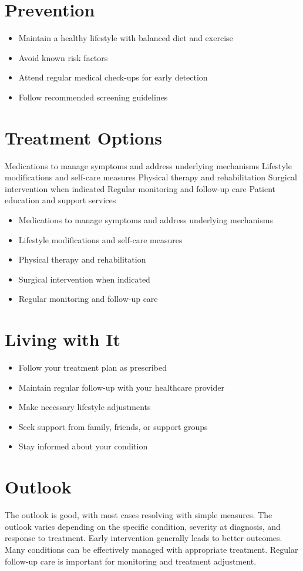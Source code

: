 \section{Prevention}
\begin{itemize}[noitemsep]
  \item Maintain a healthy lifestyle with balanced diet and exercise
  \item Avoid known risk factors
  \item Attend regular medical check-ups for early detection
  \item Follow recommended screening guidelines
\end{itemize}
\section{Treatment Options}
Medications to manage symptoms and address underlying mechanisms Lifestyle modifications and self-care measures Physical therapy and rehabilitation Surgical intervention when indicated Regular monitoring and follow-up care Patient education and support services

\begin{itemize}[noitemsep]
  \item Medications to manage symptoms and address underlying mechanisms
  \item Lifestyle modifications and self-care measures
  \item Physical therapy and rehabilitation
  \item Surgical intervention when indicated
  \item Regular monitoring and follow-up care
\end{itemize}
\section{Living with It}
\begin{itemize}[noitemsep]
  \item Follow your treatment plan as prescribed
  \item Maintain regular follow-up with your healthcare provider
  \item Make necessary lifestyle adjustments
  \item Seek support from family, friends, or support groups
  \item Stay informed about your condition
\end{itemize}
\section{Outlook}
The outlook is good, with most cases resolving with simple measures. The outlook varies depending on the specific condition, severity at diagnosis, and response to treatment. Early intervention generally leads to better outcomes. Many conditions can be effectively managed with appropriate treatment. Regular follow-up care is important for monitoring and treatment adjustment.
